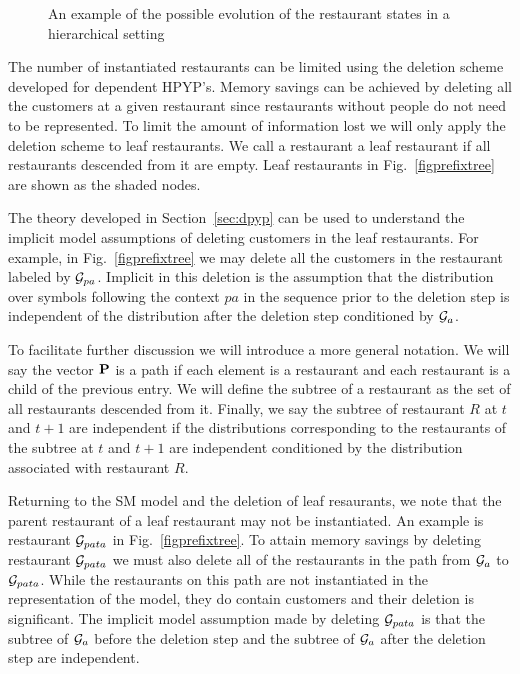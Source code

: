 \begin{figure}[t] 
	\begin{center}
		\caption{An example of the possible evolution of the restaurant states in a hierarchical setting}
		\label{figResultsCC}
	\end{center} 
\end{figure} 

The number of instantiated restaurants can be limited using the deletion scheme developed for dependent HPYP's. Memory savings can be achieved by deleting all the customers at a given restaurant since restaurants without people do not need to be represented.  To limit the amount of information lost we will only apply the deletion scheme to leaf restaurants. We call a restaurant a leaf restaurant if all restaurants descended from it are empty. Leaf restaurants in Fig.~\ref{figprefixtree} are shown as the shaded nodes. 

The theory developed in Section~\ref{sec:dpyp} can be used to understand the implicit model assumptions of deleting customers in the leaf restaurants. For example, in Fig.~\ref{figprefixtree} we may delete all the customers in the restaurant labeled by $\G_{pa}$.  Implicit in this deletion is the assumption that the distribution over symbols following the context $pa$ in the sequence prior to the deletion step is independent of the distribution after the deletion step conditioned by $\G_a$.

To facilitate further discussion we will introduce a more general notation.  We will say the vector $\bf{P}$ is a path if each element is a restaurant and each restaurant is a child of the previous entry.  We will define the subtree of a restaurant as the set of all restaurants descended from it.  Finally, we say the subtree of restaurant $R$ at $t$ and $t+1$ are independent if the distributions corresponding to the restaurants of the subtree at $t$ and $t+1$ are independent conditioned by the distribution associated with restaurant $R$.

Returning to the SM model and the deletion of leaf resaurants, we note that the parent restaurant of a leaf restaurant may not be instantiated.  An example is restaurant $\G_{pata}$ in Fig.~\ref{figprefixtree}. To attain memory savings by deleting restaurant $\G_{pata}$ we must also delete all of the restaurants in the path from $\G_a$ to $\G_{pata}$.  While the restaurants on this path are not instantiated in the representation of the model, they do contain customers and their deletion is significant.  The implicit model assumption made by deleting $\G_{pata}$ is that the subtree of $\G_a$ before the deletion step and the subtree of $\G_a$ after the deletion step are independent.

